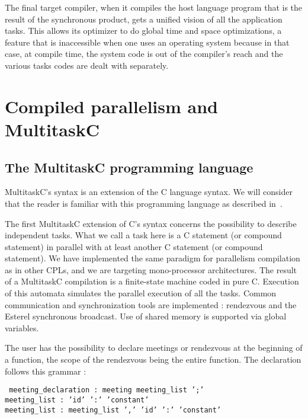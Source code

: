\documentclass[10pt]{report}
\begin{document}
The final target compiler, when it compiles the host language program that is the result of the synchronous product, gets a unified vision of all
the application tasks. This allows its optimizer to do global time and space optimizations, a feature that is inaccessible when one uses 
an operating system because in that case, at compile time, the system code is out of the compiler's reach and the various tasks codes are dealt with 
separately.

\chapter{Compiled parallelism and MultitaskC}
\label{sec:cp}

\section{The MultitaskC programming language}

MultitaskC's syntax is an extension of the C language syntax. We will consider that the reader is familiar with this programming 
language as described in~\cite{KR:88}.

The first MultitaskC extension of C's syntax concerns the possibility to describe independent tasks. What we call a task here is 
a C statement (or compound statement) in parallel with at least another C statement (or compound statement). We have implemented the same
paradigm for parallelism compilation as in other CPLs, and we are targeting mono-processor architectures. The result of
a MultitaskC compilation is a finite-state machine coded in pure C. Execution of this automata simulates the parallel execution of all the tasks. 
Common communication and synchronization tools are implemented : rendezvous and the Esterel synchronous broadcast. Use of shared memory is supported 
via global variables.

The user has the possibility to declare meetings or rendezvous at the beginning of a function, the scope
of the rendezvous being the entire function. The declaration follows this grammar :

\begin{table}[h!]
\tt
\footnotesize
meeting\_declaration : meeting meeting\_list ';'\\
meeting\_list : 'id' ':' 'constant'\\
meeting\_list : meeting\_list ',' 'id' ':' 'constant'\\
\end{table}
\end{document}
